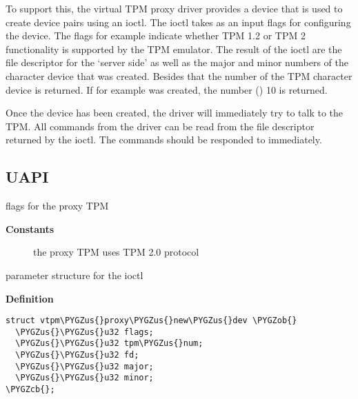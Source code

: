 \documentclass[a4paper,8pt,english]{sphinxmanual}
\def\PYGZus{\char`\_}
\def\PYGZob{\char`\{}
\def\PYGZcb{\char`\}}
\begin{document}
To support this, the virtual TPM proxy driver provides a device 
that is used to create device pairs using an ioctl. The ioctl takes as
an input flags for configuring the device. The flags  for example indicate
whether TPM 1.2 or TPM 2 functionality is supported by the TPM emulator.
The result of the ioctl are the file descriptor for the `server side'
as well as the major and minor numbers of the character device that was created.
Besides that the number of the TPM character device is returned. If for
example  was created, the number () 10 is returned.

Once the device has been created, the driver will immediately try to talk
to the TPM. All commands from the driver can be read from the file descriptor
returned by the ioctl. The commands should be responded to immediately.


\subsection{UAPI}
\label{security/tpm/tpm_vtpm_proxy:uapi}

\begin{fulllineitems}
\label{security/tpm/tpm_vtpm_proxy:c.vtpm_proxy_flags}
flags for the proxy TPM

\end{fulllineitems}


\textbf{Constants}
\begin{description}
\item[{}] \leavevmode
the proxy TPM uses TPM 2.0 protocol

\end{description}

\begin{fulllineitems}
\label{security/tpm/tpm_vtpm_proxy:c.vtpm_proxy_new_dev}
parameter structure for the  ioctl

\end{fulllineitems}


\textbf{Definition}

\begin{Verbatim}[commandchars=\\\{\}]
struct vtpm\PYGZus{}proxy\PYGZus{}new\PYGZus{}dev \PYGZob{}
  \PYGZus{}\PYGZus{}u32 flags;
  \PYGZus{}\PYGZus{}u32 tpm\PYGZus{}num;
  \PYGZus{}\PYGZus{}u32 fd;
  \PYGZus{}\PYGZus{}u32 major;
  \PYGZus{}\PYGZus{}u32 minor;
\PYGZcb{};
\end{Verbatim}
\end{document}
